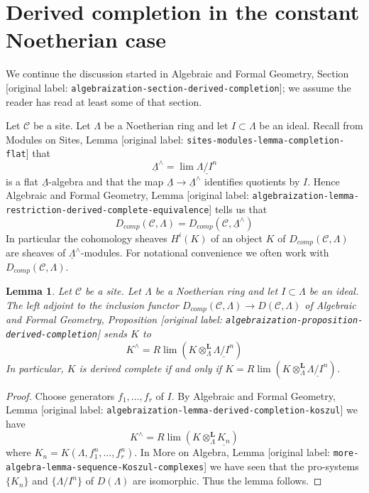\documentclass[10pt,a4paper]{article}
\theoremstyle{plain}
\newtheorem{lemma}[subsection]{Lemma}
\theoremstyle{definition}
\theoremstyle{remark}
\numberwithin{equation}{subsection}
\def\lim{\mathop{\mathrm{lim}}\nolimits}
\begin{document}
\section{Derived completion in the constant Noetherian case}
\label{section-derived-completion-noetherian}

\noindent
We continue the discussion started in Algebraic and Formal Geometry, Section
[original label: \nolinkurl{algebraization-section-derived-completion}];
we assume the reader has read at least some of that section.

\medskip\noindent
Let $\mathcal{C}$ be a site. Let $\Lambda$ be a Noetherian ring
and let $I \subset \Lambda$ be an ideal. Recall from
Modules on Sites, Lemma [original label: \nolinkurl{sites-modules-lemma-completion-flat}]
that
$$
\underline{\Lambda}^\wedge = \lim \underline{\Lambda/I^n}
$$
is a flat $\underline{\Lambda}$-algebra and that the map
$\underline{\Lambda} \to \underline{\Lambda}^\wedge$ identifies
quotients by $I$. Hence
Algebraic and Formal Geometry, Lemma
[original label: \nolinkurl{algebraization-lemma-restriction-derived-complete-equivalence}]
tells us that
$$
D_{comp}(\mathcal{C}, \Lambda) =
D_{comp}(\mathcal{C}, \underline{\Lambda}^\wedge)
$$
In particular the cohomology sheaves $H^i(K)$ of an object $K$ of
$D_{comp}(\mathcal{C}, \Lambda)$ are sheaves of
$\underline{\Lambda}^\wedge$-modules.
For notational convenience we often work with
$D_{comp}(\mathcal{C}, \Lambda)$.

\begin{lemma}
\label{lemma-naive-completion}
Let $\mathcal{C}$ be a site. Let $\Lambda$ be a Noetherian ring
and let $I \subset \Lambda$ be an ideal. The left adjoint
to the inclusion functor
$D_{comp}(\mathcal{C}, \Lambda) \to D(\mathcal{C}, \Lambda)$
of Algebraic and Formal Geometry, Proposition
[original label: \nolinkurl{algebraization-proposition-derived-completion}] sends $K$ to
$$
K^\wedge = R\lim(K \otimes_\Lambda^\mathbf{L} \underline{\Lambda/I^n})
$$
In particular, $K$ is derived complete if and only if
$K = R\lim(K \otimes_\Lambda^\mathbf{L} \underline{\Lambda/I^n})$.
\end{lemma}

\begin{proof}
Choose generators $f_1, \ldots, f_r$ of $I$. By
Algebraic and Formal Geometry, Lemma
[original label: \nolinkurl{algebraization-lemma-derived-completion-koszul}]
we have
$$
K^\wedge = 
R\lim (K \otimes_\Lambda^\mathbf{L} \underline{K_n})
$$
where $K_n = K(\Lambda, f_1^n, \ldots, f_r^n)$.
In More on Algebra, Lemma [original label: \nolinkurl{more-algebra-lemma-sequence-Koszul-complexes}]
we have seen that the pro-systems $\{K_n\}$ and
$\{\Lambda/I^n\}$ of $D(\Lambda)$
are isomorphic. Thus the lemma follows.
\end{proof}
\end{document}
